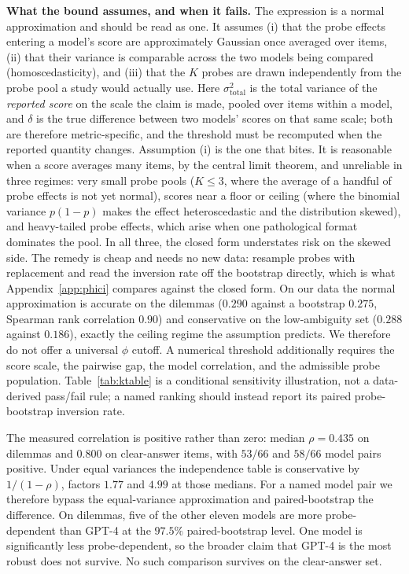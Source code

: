 \documentclass[11pt]{article}
\begin{document}
\textbf{What the bound assumes, and when it fails.} The expression is a normal
approximation and should be read as one. It assumes (i) that the probe effects
entering a model's score are approximately Gaussian once averaged over items,
(ii) that their variance is comparable across the two models being compared
(homoscedasticity), and (iii) that the $K$ probes are drawn independently from
the probe pool a study would actually use. Here $\sigma^2_{\text{total}}$ is the
total variance of the \emph{reported score} on the scale the claim is made,
pooled over items within a model, and $\delta$ is the true difference between two
models' scores on that same scale; both are therefore metric-specific, and the
threshold must be recomputed when the reported quantity changes. Assumption (i)
is the one that bites. It is reasonable when a score averages many items, by the
central limit theorem, and unreliable in three regimes: very small probe pools
($K\le3$, where the average of a handful of probe effects is not yet normal),
scores near a floor or ceiling (where the binomial variance $p(1-p)$ makes the
effect heteroscedastic and the distribution skewed), and heavy-tailed probe
effects, which arise when one pathological format dominates the pool. In all
three, the closed form understates risk on the skewed side. The remedy is
cheap and needs no new data: resample probes with replacement and read the
inversion rate off the bootstrap directly, which is what
Appendix~\ref{app:phici} compares against the closed form. On our data the normal
approximation is accurate on the dilemmas ($0.290$ against a bootstrap $0.275$,
Spearman rank correlation $0.90$) and conservative on the low-ambiguity set ($0.288$ against
$0.186$), exactly the ceiling regime the assumption predicts. We therefore do
not offer a universal $\phi$ cutoff. A numerical threshold additionally requires
the score scale, the pairwise gap, the model correlation, and the admissible probe
population. Table~\ref{tab:ktable} is a conditional sensitivity illustration,
not a data-derived pass/fail rule; a named ranking should instead report its
paired probe-bootstrap inversion rate.

The measured correlation is positive rather than zero: median $\rho=0.435$ on
dilemmas and $0.800$ on clear-answer items, with $53/66$ and $58/66$ model pairs
positive. Under equal variances the independence table is conservative by
$1/(1-\rho)$, factors $1.77$ and $4.99$ at those medians. For a named model pair
we therefore bypass the equal-variance approximation and paired-bootstrap the
difference. On dilemmas, five of the other eleven models are more
probe-dependent than GPT-4 at the $97.5\%$ paired-bootstrap level. One model is
significantly less probe-dependent, so the broader claim that GPT-4 is the most
robust does not survive. No such comparison survives on the clear-answer set.
\end{document}
